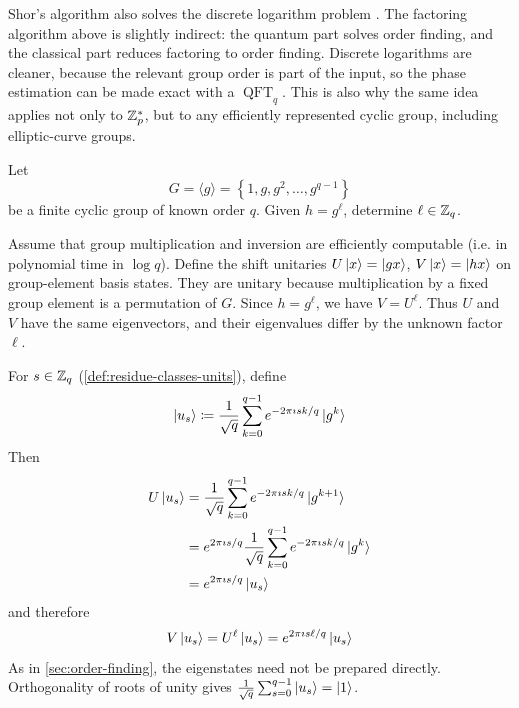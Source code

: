 Shor's algorithm also solves the discrete logarithm problem \cite{shorAlgorithms,laneveQuantumAlgorithms}.
The factoring algorithm above is slightly indirect: the quantum part solves order finding, and the classical part reduces factoring to order finding.
Discrete logarithms are cleaner, because the relevant group order is part of the input, so the phase estimation can be made exact with a \(\operatorname{QFT}_q\).
This is also why the same idea applies not only to
\(
\mathbb{Z}_p^*
\),
but to any efficiently represented cyclic group, including elliptic-curve groups.

\begin{problem}\label{problem:discrete-logarithm}
Let
\[
G
=
\langle g\rangle
=
\left\{
1,g,g^2,\ldots,g^{q-1}
\right\}
\]
be a finite cyclic group of known order \(q\).
Given
\(
h=g^\ell
\),
determine
\(
\ell\in\mathbb{Z}_q
\).
\end{problem}

Assume that group multiplication and inversion are efficiently computable (i.e. in polynomial time in \(\log q\)).
Define the shift unitaries
\(
U\ket x
=
\ket{gx}
\),
\(
V\ket x
=
\ket{hx}
\)
on group-element basis states.
They are unitary because multiplication by a fixed group element is a permutation of \(G\).
Since
\(
h=g^\ell
\),
we have
\(
V
=
U^\ell
\).
Thus \(U\) and \(V\) have the same eigenvectors, and their eigenvalues differ by the unknown factor \(\ell\).

For \(s\in\mathbb{Z}_q\) (\autoref{def:residue-classes-units}), define
\[
\ket{u_s}
\coloneqq
\frac1{\sqrt q}
\sum_{k=0}^{q-1}
e^{-2\pi\imath sk/q}
\ket{g^k}
\]
Then
\[
\begin{aligned}
U\ket{u_s}
&=
\frac1{\sqrt q}
\sum_{k=0}^{q-1}
e^{-2\pi\imath sk/q}
\ket{g^{k+1}}
\\
&=
e^{2\pi\imath s/q}
\frac1{\sqrt q}
\sum_{k=0}^{q-1}
e^{-2\pi\imath sk/q}
\ket{g^k}
\\
&=
e^{2\pi\imath s/q}\ket{u_s}
\end{aligned}
\]
and therefore
\[
V\ket{u_s}
=
U^\ell\ket{u_s}
=
e^{2\pi\imath s\ell/q}\ket{u_s}
\]
As in \autoref{sec:order-finding}, the eigenstates need not be prepared directly.
Orthogonality of roots of unity gives
\(
\frac1{\sqrt q}
\sum_{s=0}^{q-1}
\ket{u_s}
=
\ket1
\).

